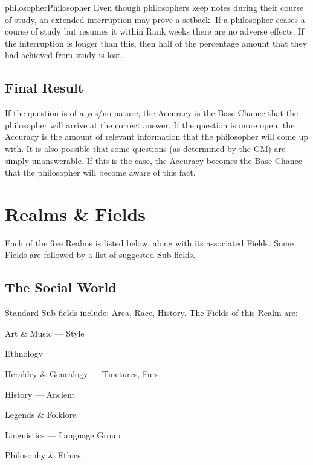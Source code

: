 \begin{Skill}[2.0]{philosopher}{Philosopher}
Even though philosophers keep notes during their course of study, an
extended interruption may prove a setback. If a philosopher ceases a
course of study but resumes it within Rank weeks there are no adverse
effects. If the interruption is longer than this, then half of the
percentage amount that they had achieved from study is lost.

\subsection{Final Result}

If the question is of a yes/no nature, the Accuracy is the Base Chance
that the philosopher will arrive at the correct answer. If the
question is more open, the Accuracy is the amount of relevant
information that the philosopher will come up with.  It is also
possible that some questions (as determined by the GM) are simply
unanswerable.  If this is the case, the Accuracy becomes the Base
Chance that the philosopher will become aware of this fact.

\section{Realms \& Fields}

Each of the five Realms is listed below, along with its associated
Fields.  Some Fields are followed by a list of suggested Sub-fields.

\subsection{The Social World}

Standard Sub-fields include: Area, Race, History.  The Fields of this
Realm are:

\begin{Itemize}
\item Art \& Music — Style  

\item Ethnology  

\item Heraldry \& Genealogy — Tinctures, Furs  

\item History — Ancient  

\item Legends \& Folklore  

\item Linguistics — Language Group  

\item Philosophy \& Ethics  


\end{Itemize}
\end{Skill}
